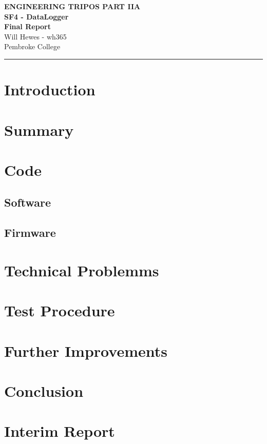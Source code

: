 \documentclass[a4paper,11pt]{article}
\renewcommand{\maketitle}{
    \begin{center}
        \LARGE \textbf{ENGINEERING TRIPOS PART IIA} \\[0.5em]
        \Large \textbf{SF4 - DataLogger} \\[0.5em]
        \textbf{Final Report} \\[1.5em]
        \vspace{-1em}
        \small Will Hewes - wh365 \\ 
        Pembroke College \\ 
        \vspace{0.5em}
    \end{center}
}
\begin{document}

\maketitle
\hrule
\tableofcontents
\newpage

\section{Introduction}
\label{sec:Introduction}

\section{Summary}
\label{sec:Summary}

\section{Code}
\label{sec:Code}
\subsection{Software}
\label{sec:Software}

\subsection{Firmware}
\label{sec:Firmware}

\section{Technical Problemms}
\label{sec:Technical_Problems}

\section{Test Procedure}
\label{sec:Test_Procedure}

\section{Further Improvements}
\label{sec:Further_Improvements}

\section{Conclusion}
\label{sec:Conclusion}

\begin{thebibliography}{9}

\end{thebibliography}

\newpage
\appendix
\section{Interim Report}
\end{document}
